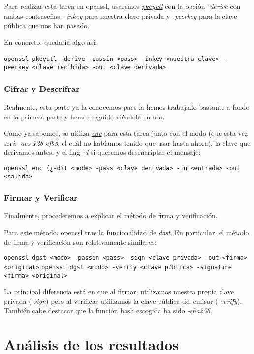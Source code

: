\documentclass[a4paper, 11pt]{article}
\begin{document}
			Para realizar esta tarea en openssl, usaremos \href{https://www.openssl.org/docs/man1.0.2/apps/pkeyutl.html}
			{\textit{pkeyutl}} con la opción \textit{-derive} con ambas contraseñas: \textit{-inkey} para nuestra clave privada
			y \textit{-peerkey} para la clave pública que nos han pasado.
			
			En concreto, quedaría algo así:
			\begin{small}
				\verb|openssl pkeyutl -derive -passin <pass> -inkey <nuestra clave>|
				\verb| -peerkey <clave recibida> -out <clave derivada>|
			\end{small}
				
		\subsubsection{Cifrar y Descrifrar}
			Realmente, esta parte ya la conocemos pues la hemos trabajado bastante a fondo en la primera parte y hemos seguido
			viéndola en uso.
			
			Como ya sabemos, se utiliza \href{https://www.openssl.org/docs/man1.0.2/apps/enc.html}{\textit{enc}} para esta
			tarea junto con el modo (que esta vez será \textit{-aes-128-cfb8}, el cuál no habíamos tenido que usar hasta
			ahora), la clave que derivamos antes, y el flag \textit{-d} si queremos desencriptar el mensaje:
			
			\begin{small}
				\verb|openssl enc (¿-d?) <mode> -pass <clave derivada> -in <entrada> -out <salida>|
			\end{small}
		
		\subsubsection{Firmar y Verificar}		
			Finalmente, procederemos a explicar el método de firma y verificación.
			
			Para este método, openssl trae la funcionalidad de \href{https://www.openssl.org/docs/man1.0.2/apps/dgst.html}
			{\textit{dgst}}. En particular, el método de firma y verificación son relativamente similares:

			\begin{small}
				\verb|openssl dgst <modo> -passin <pass> -sign <clave privada> -out <firma> <original>|
				\verb|openssl dgst <modo> -verify <clave pública> -signature <firma> <original>|
			\end{small}
			
			La principal diferencia está en que al firmar, utilizamos nuestra propia clave privada (\textit{-sign}) pero
			al verificar utilizamos la clave pública del emisor (\textit{-verify}). También cabe destacar que la función hash
			escogida ha sido \textit{-sha256}.
			
\section{Análisis de los resultados}
	
\end{document}
